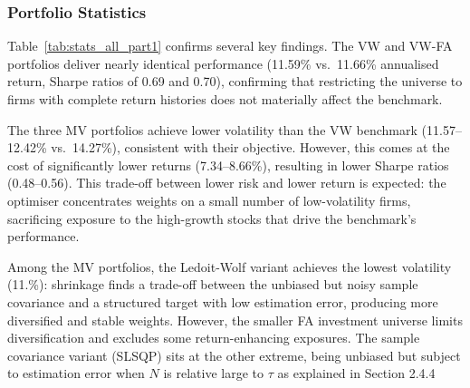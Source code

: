 \documentclass[11pt,a4paper]{article}
\begin{document}
\subsubsection{Portfolio Statistics}

\begin{table}[H]
\centering
\captionsetup{font=footnotesize, justification=centering}
\caption{Annualised performance statistics --- All Part I portfolios.}
\label{tab:stats_all_part1}
\end{table}

Table~\ref{tab:stats_all_part1} confirms several key findings. The VW and VW-FA portfolios deliver nearly identical performance (11.59\% vs.\ 11.66\% annualised return, Sharpe ratios of 0.69 and 0.70), confirming that restricting the universe to firms with complete return histories does not materially affect the benchmark.

The three MV portfolios achieve lower volatility than the VW benchmark (11.57--12.42\% vs.\ 14.27\%), consistent with their objective. However, this comes at the cost of significantly lower returns (7.34--8.66\%), resulting in lower Sharpe ratios (0.48--0.56). This trade-off between lower risk and lower return is expected: the optimiser concentrates weights on a small number of low-volatility firms, sacrificing exposure to the high-growth stocks that drive the benchmark's performance.

Among the MV portfolios, the Ledoit-Wolf variant achieves the lowest volatility (11.\%): shrinkage finds a trade-off between the unbiased but noisy sample covariance and a structured target with low estimation error, producing more diversified and stable weights. However, the smaller FA investment universe limits diversification and excludes some return-enhancing exposures. The sample covariance variant (SLSQP) sits at the other extreme, being unbiased but subject to estimation error when  $N$ is relative large to $\tau$ as explained in Section 2.4.4
\end{document}
